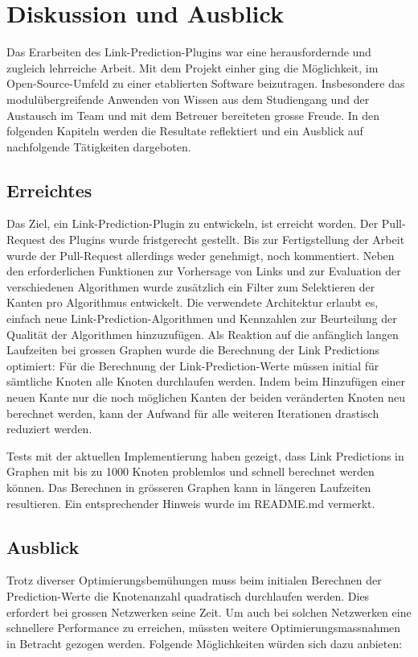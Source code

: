 \chapter{Diskussion und Ausblick}

Das Erarbeiten des Link-Prediction-Plugins war eine herausfordernde und zugleich lehrreiche Arbeit.
Mit dem Projekt einher ging die Möglichkeit, im Open-Source-Umfeld zu einer etablierten Software beizutragen.
Insbesondere das modulübergreifende Anwenden von Wissen aus dem Studiengang und der Austausch im Team und mit dem Betreuer bereiteten grosse Freude.
In den folgenden Kapiteln werden die Resultate reflektiert und ein Ausblick auf nachfolgende Tätigkeiten dargeboten.

\section{Erreichtes}

Das Ziel, ein Link-Prediction-Plugin zu entwickeln, ist erreicht worden. Der Pull-Request des Plugins wurde fristgerecht gestellt.
Bis zur Fertigstellung der Arbeit wurde der Pull-Request allerdings weder genehmigt, noch kommentiert.
Neben den erforderlichen Funktionen zur Vorhersage von Links und zur Evaluation der verschiedenen Algorithmen wurde zusätzlich ein Filter zum Selektieren der Kanten pro Algorithmus entwickelt.
Die verwendete Architektur erlaubt es, einfach neue Link-Prediction-Algorithmen und Kennzahlen zur Beurteilung der Qualität der Algorithmen hinzuzufügen.
Als Reaktion auf die anfänglich langen Laufzeiten bei grossen Graphen wurde die Berechnung der Link Predictions optimiert:
Für die Berechnung der Link-Prediction-Werte müssen initial für sämtliche Knoten alle Knoten durchlaufen werden.
Indem beim Hinzufügen einer neuen Kante nur die noch möglichen Kanten der beiden veränderten Knoten neu berechnet werden, kann der Aufwand für alle weiteren Iterationen drastisch reduziert werden.

Tests mit der aktuellen Implementierung haben gezeigt, dass Link Predictions in Graphen mit bis zu 1000 Knoten problemlos und schnell berechnet werden können.
Das Berechnen in grösseren Graphen kann in längeren Laufzeiten resultieren.
Ein entsprechender Hinweis wurde im README.md vermerkt.

\section{Ausblick}

Trotz diverser Optimierungsbemühungen muss beim initialen Berechnen der Prediction-Werte die Knotenanzahl quadratisch durchlaufen werden.
Dies erfordert bei grossen Netzwerken seine Zeit.
Um auch bei solchen Netzwerken eine schnellere Performance zu erreichen, müssten weitere Optimierungsmassnahmen in Betracht gezogen werden.
Folgende Möglichkeiten würden sich dazu anbieten:

